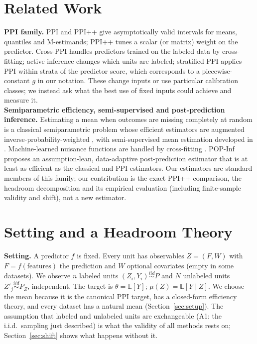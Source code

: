 \documentclass{article}
\newcommand{\E}{\mathbb{E}}
\begin{document}
\section{Related Work}
\textbf{PPI family.} PPI \citep{angelopoulos2023ppi} and PPI++ \citep{angelopoulos2023ppipp} give asymptotically valid intervals for means, quantiles and M-estimands; PPI++ tunes a scalar (or matrix) weight on the predictor. Cross-PPI \citep{zrnic2023cross} handles predictors trained on the labeled data by cross-fitting; active inference \citep{zrnic2024active} changes which units are labeled; stratified PPI \citep{fisch2024stratified} applies PPI within strata of the predictor score, which corresponds to a piecewise-constant $g$ in our notation. These change inputs or use particular calibration classes; we instead ask what the best use of fixed inputs could achieve and measure it.\\
\textbf{Semiparametric efficiency, semi-supervised and post-prediction inference.} Estimating a mean when outcomes are missing completely at random is a classical semiparametric problem whose efficient estimators are augmented inverse-probability-weighted \citep{robins1994estimation,bickel1993efficient,tsiatis2006semiparametric}, with semi-supervised mean estimation developed in \citet{zhang2019semisup}. Machine-learned nuisance functions are handled by cross-fitting \citep{chernozhukov2018dml}. POP-Inf \citep{miao2023popinf} proposes an assumption-lean, data-adaptive post-prediction estimator that is at least as efficient as the classical and PPI estimators. Our estimators are standard members of this family; our contribution is the exact PPI++ comparison, the headroom decomposition and its empirical evaluation (including finite-sample validity and shift), not a new estimator.

\section{Setting and a Headroom Theory}\label{sec:theory}
\textbf{Setting.} A predictor $f$ is fixed. Every unit has observables $Z=(F,W)$ with $F=f(\text{features})$ the prediction and $W$ optional covariates (empty in some datasets). We observe $n$ labeled units $(Z_i,Y_i)\overset{iid}{\sim}P$ and $N$ unlabeled units $Z'_j\overset{iid}{\sim}P_Z$, independent. The target is $\theta=\E[Y]$; $\mu(Z)=\E[Y\mid Z]$. We choose the mean because it is the canonical PPI target, has a closed-form efficiency theory, and every dataset has a natural mean (Section~\ref{sec:setup}). The assumption that labeled and unlabeled units are exchangeable (A1: the i.i.d.\ sampling just described) is what the validity of all methods rests on; Section~\ref{sec:shift} shows what happens without it.
\end{document}
